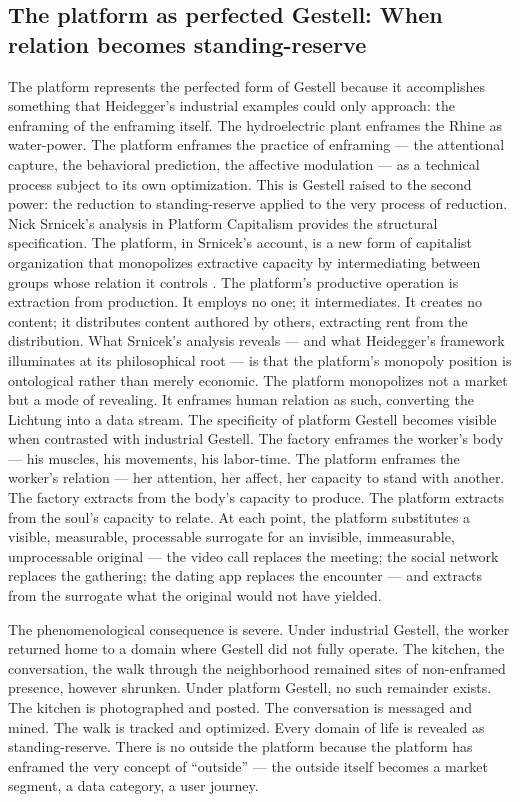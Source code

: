 \subsection{The platform as perfected Gestell: When relation becomes standing-reserve}

The platform represents the perfected form of Gestell because it accomplishes something that Heidegger’s industrial examples could only approach: the enframing of the enframing itself. The hydroelectric plant enframes the Rhine as water-power. The platform enframes the practice of enframing — the attentional capture, the behavioral prediction, the affective modulation — as a technical process subject to its own optimization. This is Gestell raised to the second power: the reduction to standing-reserve applied to the very process of reduction. Nick Srnicek’s analysis in Platform Capitalism provides the structural specification. The platform, in Srnicek’s account, is a new form of capitalist organization that monopolizes extractive capacity by intermediating between groups whose relation it controls \cite{srnicek_2017}. The platform’s productive operation is extraction from production. It employs no one; it intermediates. It creates no content; it distributes content authored by others, extracting rent from the distribution. What Srnicek’s analysis reveals — and what Heidegger’s framework illuminates at its philosophical root — is that the platform’s monopoly position is ontological rather than merely economic. The platform monopolizes not a market but a mode of revealing. It enframes human relation as such, converting the Lichtung into a data stream. The specificity of platform Gestell becomes visible when contrasted with industrial Gestell. The factory enframes the worker’s body — his muscles, his movements, his labor-time. The platform enframes the worker’s relation — her attention, her affect, her capacity to stand with another. The factory extracts from the body’s capacity to produce. The platform extracts from the soul’s capacity to relate. At each point, the platform substitutes a visible, measurable, processable surrogate for an invisible, immeasurable, unprocessable original — the video call replaces the meeting; the social network replaces the gathering; the dating app replaces the encounter — and extracts from the surrogate what the original would not have yielded.

The phenomenological consequence is severe. Under industrial Gestell, the worker returned home to a domain where Gestell did not fully operate. The kitchen, the conversation, the walk through the neighborhood remained sites of non-enframed presence, however shrunken. Under platform Gestell, no such remainder exists. The kitchen is photographed and posted. The conversation is messaged and mined. The walk is tracked and optimized. Every domain of life is revealed as standing-reserve. There is no outside the platform because the platform has enframed the very concept of “outside” — the outside itself becomes a market segment, a data category, a user journey.

